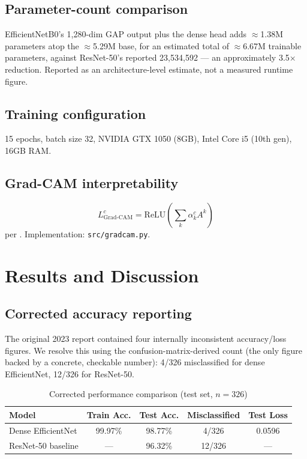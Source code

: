 \documentclass[journal]{IEEEtran}
\begin{document}
\subsection{Parameter-count comparison}
EfficientNetB0's 1,280-dim GAP output plus the dense head adds $\approx$1.38M parameters atop the $\approx$5.29M base, for an estimated total of $\approx$6.67M trainable parameters, against ResNet-50's reported 23{,}534{,}592 --- an approximately 3.5$\times$ reduction. Reported as an architecture-level estimate, not a measured runtime figure.

\subsection{Training configuration}
15 epochs, batch size 32, NVIDIA GTX 1050 (8GB), Intel Core i5 (10th gen), 16GB RAM.

\subsection{Grad-CAM interpretability}
\begin{equation}
L^c_{\text{Grad-CAM}} = \text{ReLU}\left(\sum_k \alpha_k^c A^k\right)
\end{equation}
per \cite{ref4}. Implementation: \texttt{src/gradcam.py}.

\section{Results and Discussion}

\subsection{Corrected accuracy reporting}
The original 2023 report contained four internally inconsistent accuracy/loss figures. We resolve this using the confusion-matrix-derived count (the only figure backed by a concrete, checkable number): 4/326 misclassified for dense EfficientNet, 12/326 for ResNet-50.

\begin{table}[h]
\centering
\caption{Corrected performance comparison (test set, $n=326$)}
\begin{tabular}{@{}lcccc@{}}
\toprule
Model & Train Acc. & Test Acc. & Misclassified & Test Loss \\
\midrule
Dense EfficientNet & 99.97\% & 98.77\% & 4/326 & 0.0596 \\
ResNet-50 baseline & --- & 96.32\% & 12/326 & --- \\
\bottomrule
\end{tabular}
\end{table}
\end{document}

